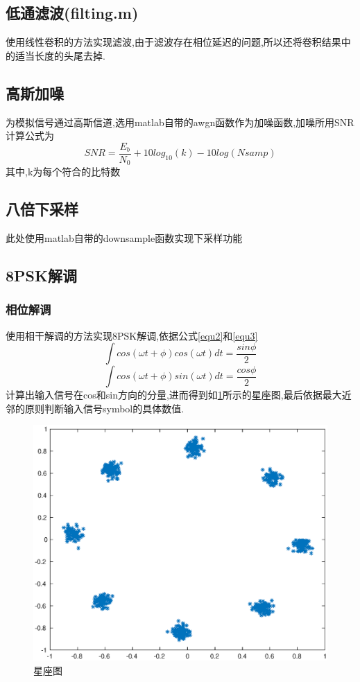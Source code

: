 \documentclass[UTF8]{article}
\begin{document}
\begin{CJK}{UTF8}{gkai}
\subsection{低通滤波(filting.m)}
使用线性卷积的方法实现滤波,由于滤波存在相位延迟的问题,所以还将卷积结果中的适当长度的头尾去掉.
\subsection{高斯加噪}
为模拟信号通过高斯信道,选用matlab自带的awgn函数作为加噪函数,加噪所用SNR计算公式为
$$SNR=\frac{E_b}{N_0}+10log_10(k)-10log(Nsamp)$$
其中,k为每个符合的比特数
\subsection{八倍下采样}
此处使用matlab自带的downsample函数实现下采样功能
\subsection{8PSK解调}
\subsubsection{相位解调}
使用相干解调的方法实现8PSK解调,依据公式\ref{equ2}和\ref{equ3}
$$\label{equ2}\int cos(\omega t+\phi)cos(\omega t)dt=\frac{sin\phi}{2}$$
$$\label{equ3}\int cos(\omega t+\phi)sin(\omega t)dt=\frac{cos\phi}{2}$$
计算出输入信号在cos和sin方向的分量,进而得到如\ref{stars}所示的星座图,最后依据最大近邻的原则判断输入信号symbol的具体数值.
\begin{figure}[H]
    \centering
    \includegraphics[scale=0.5]{stars.eps}
    \caption{星座图}
    \label{stars}
\end{figure}

\end{CJK}
\end{document}
